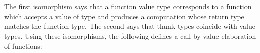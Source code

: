 \begin{code}[hide]
\AgdaOperator{\AgdaFunction{\AgdaUnderscore{}>>\AgdaUnderscore{}}}\AgdaSymbol{)}\<%
\\
%
\>[6]\AgdaSpace{}%
\<%
\\
\>[0]\<%
\\
%
\\[\AgdaEmptyExtraSkip]%
\>[0]\<%
\\
\>[0][@{}l@{\AgdaIndent{0}}]%
\>[6]\AgdaSpace{}%
\AgdaOperator{\AgdaFunction{\AgdaUnderscore{}>>=\AgdaUnderscore{}}}\AgdaSpace{}%
\AgdaSymbol{=}\AgdaSpace{}%
\<%
\\
%
\>[6]\AgdaSpace{}%
\<%
\end{code}
\begin{code}%
\>[6][@{}l@{\AgdaIndent{1}}]%
\>[8]%
\>[15]\AgdaSymbol{:}\AgdaSpace{}%
\AgdaSymbol{\{}\AgdaSpace{}%
\AgdaSpace{}%
\AgdaSymbol{:}\AgdaSpace{}%
\AgdaSymbol{\}}%
\>[33]\AgdaSpace{}%
\AgdaSpace{}%
\AgdaSpace{}%
\AgdaSpace{}%
%
\>[46]%
\>[51]%
\>[55]\AgdaSymbol{(}\AgdaSpace{}%
\AgdaSpace{}%
\AgdaSpace{}%
\AgdaSpace{}%
\AgdaSpace{}%
\AgdaSpace{}%
\AgdaSpace{}%
\AgdaSpace{}%
\AgdaSymbol{)}\<%
\\
%
\>[8]%
\>[15]\AgdaSymbol{:}\AgdaSpace{}%
\AgdaSymbol{\{}\AgdaSpace{}%
\AgdaSymbol{:}\AgdaSpace{}%
\AgdaSymbol{\}}%
\>[33]\AgdaSpace{}%
\AgdaSpace{}%
\AgdaSpace{}%
%
\>[46]%
\>[51]%
\>[55]\AgdaSpace{}%
\AgdaSpace{}%
\<%
\end{code}
%
The first isomorphism says that a function value type corresponds to a function which accepts a value of type  and produces a computation whose return type matches the function type.
The second says that thunk types coincide with value types.
Using these isomorphisms, the following defines a call-by-value elaboration of functions:
